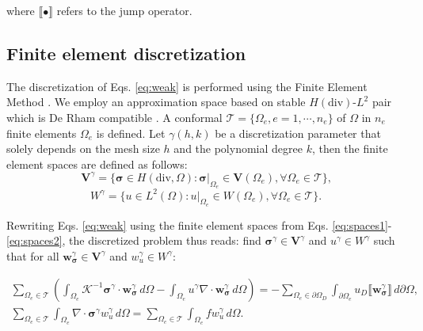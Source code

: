 \documentclass{wccm2024}
\begin{document}
\noindent where $\llbracket \bullet \rrbracket$ refers to the jump operator.

\subsection{Finite element discretization}

The discretization of Eqs. \eqref{eq:weak} is performed using the Finite Element Method \cite{becker1981finite}. We employ an approximation space based on stable $H(\text{div})$-$L^2$ pair which is De Rham compatible \cite{devloo2022efficient,de2013new}. A conformal $\mathcal{T}=\{\Omega_e,e=1, \cdots, n_e \}$ of $\Omega$ in $n_e$ finite elements $\Omega_e$ is defined. Let $\gamma(h,k)$ be a discretization parameter that solely depends on the mesh size $h$ and the polynomial degree $k$, then the finite element spaces are defined as follows:
\vskip -0.3cm
\begin{equation} \label{eq:spaces1}
    \mathbf{V}^\gamma = \{ \boldsymbol{\sigma} \in H(\text{div},\Omega) : \boldsymbol{\sigma}|_{\Omega_e} \in \mathbf{V}(\Omega_e), \forall \Omega_e \in \mathcal{T} \} \text{,}
\end{equation}
\vskip -0.3cm
\begin{equation} \label{eq:spaces2}
    W^\gamma = \{ u \in L^2(\Omega) : u|_{\Omega_e} \in W(\Omega_e), \forall \Omega_e \in \mathcal{T} \} \text{.}
\end{equation}

Rewriting Eqs. \eqref{eq:weak} using the finite element spaces from Eqs. \eqref{eq:spaces1}-\eqref{eq:spaces2}, the discretized problem thus reads: find $\boldsymbol{\sigma}^\gamma \in \mathbf{V}^\gamma$ and $u^\gamma \in W^\gamma$ such that for all $\mathbf{w}_{\boldsymbol{\sigma}}^\gamma \in \mathbf{V}^\gamma$ and $w_u^\gamma \in W^\gamma$:

\begin{equation} \label{eq:discrete}
    \begin{split}
        \sum_{\Omega_e \in \mathcal{T}} \left(\int_{\Omega_e} \mathcal{K}^{-1}\boldsymbol{\sigma}^\gamma \cdot \mathbf{w}_{\boldsymbol{\sigma}}^\gamma \, d\Omega - \int_{\Omega_e} u^\gamma \nabla \cdot \mathbf{w}_{\boldsymbol{\sigma}}^\gamma \, d\Omega \right)=- \sum_{\Omega_e \in \partial\Omega_D} \int_{\partial\Omega_e} u_D \llbracket \mathbf{w}^\gamma_{\boldsymbol{\sigma}} \rrbracket \, d\partial\Omega, \\
        \sum_{\Omega_e \in \mathcal{T}} \int_{\Omega_e} \nabla \cdot \boldsymbol{\sigma}^\gamma w_u^\gamma \, d\Omega = \sum_{\Omega_e \in \mathcal{T}} \int_{\Omega_e} f w_u^\gamma \, d\Omega.
    \end{split}
\end{equation}
\end{document}
